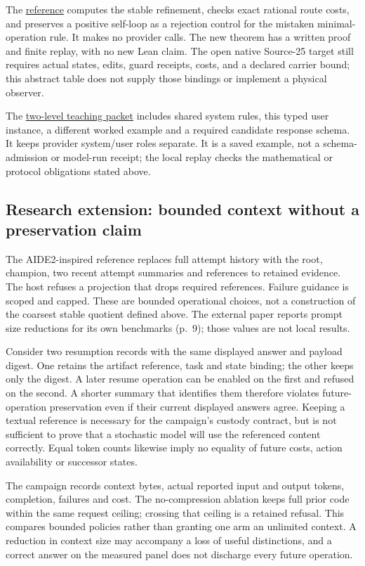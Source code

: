 \documentclass[
  11pt,
]{article}
\begin{document}
The \href{code/replay.py}{reference} computes the stable refinement,
checks exact rational route costs, and preserves a positive self-loop as
a rejection control for the mistaken minimal-operation rule. It makes no
provider calls. The new theorem has a written proof and finite replay,
with no new Lean claim. The open native Source-25 target still requires
actual states, edits, guard receipts, costs, and a declared carrier
bound; this abstract table does not supply those bindings or implement a
physical observer.

The \href{prompts/example.yaml}{two-level teaching packet} includes
shared system rules, this typed user instance, a different worked
example and a required candidate response schema. It keeps provider
system/user roles separate. It is a saved example, not a
schema-admission or model-run receipt; the local replay checks the
mathematical or protocol obligations stated above.

\subsection{Research extension: bounded context without a preservation
claim}\label{research-extension-bounded-context-without-a-preservation-claim}

The AIDE2-inspired reference replaces full attempt history with the
root, champion, two recent attempt summaries and references to retained
evidence. The host refuses a projection that drops required references.
Failure guidance is scoped and capped. These are bounded operational
choices, not a construction of the coarsest stable quotient defined
above. The external paper reports prompt size reductions for its own
benchmarks (p.~9); those values are not local results.

Consider two resumption records with the same displayed answer and
payload digest. One retains the artifact reference, task and state
binding; the other keeps only the digest. A later resume operation can
be enabled on the first and refused on the second. A shorter summary
that identifies them therefore violates future-operation preservation
even if their current displayed answers agree. Keeping a textual
reference is necessary for the campaign's custody contract, but is not
sufficient to prove that a stochastic model will use the referenced
content correctly. Equal token counts likewise imply no equality of
future costs, action availability or successor states.

The campaign records context bytes, actual reported input and output
tokens, completion, failures and cost. The no-compression ablation keeps
full prior code within the same request ceiling; crossing that ceiling
is a retained refusal. This compares bounded policies rather than
granting one arm an unlimited context. A reduction in context size may
accompany a loss of useful distinctions, and a correct answer on the
measured panel does not discharge every future operation.
\end{document}
